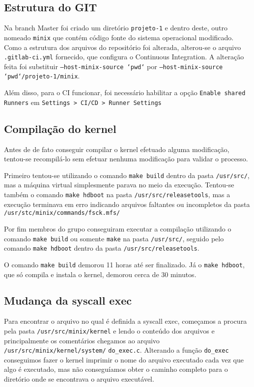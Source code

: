 \documentclass[12pt,journal,compsoc]{IEEEtran}
\begin{document}
\subsection{Estrutura do GIT}

Na branch Master foi criado um diretório \texttt{projeto-1} e dentro deste, outro nomeado \texttt{minix} que contém código fonte do sistema operacional modificado. Como a estrutura dos arquivos do repositório foi alterada, alterou-se o arquivo \texttt{.gitlab-ci.yml} fornecido, que configura o Continuous Integration. A alteração feita foi substituir \texttt{--host-minix-source `pwd`} por \texttt{--host-minix-source `pwd`/projeto-1/minix}.

Além disso, para o CI funcionar, foi necessário habilitar a opção \texttt{Enable shared Runners} em \texttt{Settings > CI/CD > Runner Settings}

\subsection{Compilação do kernel}

Antes de de fato conseguir compilar o kernel efetuado alguma modificação, tentou-se recompilá-lo sem efetuar nenhuma modifica\c{c}ão para validar o processo. 

Primeiro tentou-se utilizando o comando \texttt{make build} dentro da pasta \texttt{/usr/src/}, mas a máquina virtual simplesmente parava no meio da execução. Tentou-se também o comando \texttt{make hdboot} na pasta  \texttt{/usr/src/releasetools}, mas a execução terminava em erro indicando arquivos faltantes ou incompletos da pasta \texttt{/usr/stc/minix/commands/fsck.mfs/} 

Por fim membros do grupo conseguiram executar a compila\c{c}ão utilizando o comando \texttt{make build} ou somente \texttt{make} na pasta \texttt{/usr/src/}, seguido pelo comando \texttt{make hdboot} dentro da pasta \texttt{/usr/src/releasetools}. \cite{compilacaoKernel:wiki}

O comando \texttt{make build} demorou 11 horas até ser finalizado. Já o \texttt{make hdboot}, que só compila e instala o kernel, demorou cerca de 30 minutos.

\subsection{Mudança da syscall exec}

Para encontrar o arquivo no qual é definida a syscall exec, começamos a procura pela pasta \texttt{/usr/src/minix/kernel} e lendo o conteúdo dos arquivos e principalmente os comentários chegamos ao arquivo \texttt{/usr/src/minix/kernel/system/} \texttt{do\_exec.c}. Alterando a função \texttt{do\_exec} conseguimos fazer o kernel imprimir o nome do arquivo executado cada vez que algo é executado, mas não conseguíamos obter o caminho completo para o diretório onde se encontrava o arquivo executável.
\end{document}
